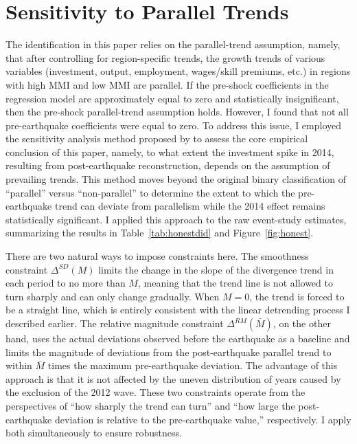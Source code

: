 \documentclass[12pt]{article}
\begin{document}
\FloatBarrier
\section{Sensitivity to Parallel Trends}\label{sec:honest}

The identification in this paper relies on the parallel-trend assumption, namely, that after controlling
for region-specific trends, the growth trends of various variables (investment, output, employment,
wages/skill premiums, etc.) in regions with high MMI and low MMI are parallel. If the pre-shock
coefficients in the regression model are approximately equal to zero and statistically insignificant,
then the pre-shock parallel-trend assumption holds. However, I found that not all pre-earthquake
coefficients were equal to zero. To address this issue, I employed the sensitivity analysis method
proposed by \citet{rambachanroth2023} to assess the core empirical conclusion of this paper, namely, to
what extent the investment spike in 2014, resulting from post-earthquake reconstruction, depends on the
assumption of prevailing trends. This method moves beyond the original binary classification of
``parallel'' versus ``non-parallel'' to determine the extent to which the pre-earthquake trend can
deviate from parallelism while the 2014 effect remains statistically significant. I applied this
approach to the raw event-study estimates, summarizing the results in Table~\ref{tab:honestdid} and
Figure~\ref{fig:honest}.

There are two natural ways to impose constraints here. The smoothness constraint $\Delta^{SD}(M)$ limits
the change in the slope of the divergence trend in each period to no more than $M$, meaning that the
trend line is not allowed to turn sharply and can only change gradually. When $M=0$, the trend is forced
to be a straight line, which is entirely consistent with the linear detrending process I described
earlier. The relative magnitude constraint $\Delta^{RM}(\bar M)$, on the other hand, uses the actual
deviations observed before the earthquake as a baseline and limits the magnitude of deviations from the
post-earthquake parallel trend to within $\bar M$ times the maximum pre-earthquake deviation. The
advantage of this approach is that it is not affected by the uneven distribution of years caused by the
exclusion of the 2012 wave. These two constraints operate from the perspectives of ``how sharply the
trend can turn'' and ``how large the post-earthquake deviation is relative to the pre-earthquake value,''
respectively. I apply both simultaneously to ensure robustness.
\end{document}

